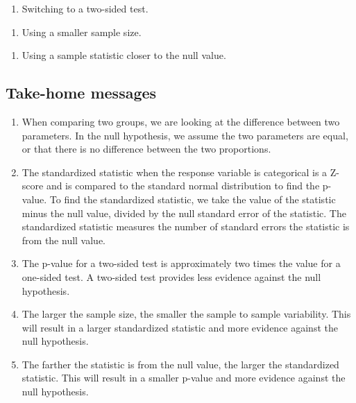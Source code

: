 \documentclass[
]{report}
\providecommand{\tightlist}{%
  \setlength{\itemsep}{0pt}\setlength{\parskip}{0pt}}
\begin{document}
\begin{enumerate}
\def\labelenumi{\alph{enumi})}
\tightlist
\item
  Switching to a two-sided test.
\end{enumerate}

\vspace{0.4in}

\begin{enumerate}
\def\labelenumi{\alph{enumi})}
\setcounter{enumi}{1}
\tightlist
\item
  Using a smaller sample size.
\end{enumerate}

\vspace{0.4in}

\begin{enumerate}
\def\labelenumi{\alph{enumi})}
\setcounter{enumi}{2}
\tightlist
\item
  Using a sample statistic closer to the null value.
\end{enumerate}

\vspace{0.4in}

\newpage

\hypertarget{take-home-messages-13}{%
\subsection{Take-home messages}\label{take-home-messages-13}}

\begin{enumerate}
\def\labelenumi{\arabic{enumi}.}
\item
  When comparing two groups, we are looking at the difference between two parameters. In the null hypothesis, we assume the two parameters are equal, or that there is no difference between the two proportions.
\item
  The standardized statistic when the response variable is categorical is a Z-score and is compared to the standard normal distribution to find the p-value. To find the standardized statistic, we take the value of the statistic minus the null value, divided by the null standard error of the statistic. The standardized statistic measures the number of standard errors the statistic is from the null value.
\item
  The p-value for a two-sided test is approximately two times the value for a one-sided test. A two-sided test provides less evidence against the null hypothesis.
\item
  The larger the sample size, the smaller the sample to sample variability. This will result in a larger standardized statistic and more evidence against the null hypothesis.
\item
  The farther the statistic is from the null value, the larger the standardized statistic. This will result in a smaller p-value and more evidence against the null hypothesis.
\end{enumerate}
\end{document}
